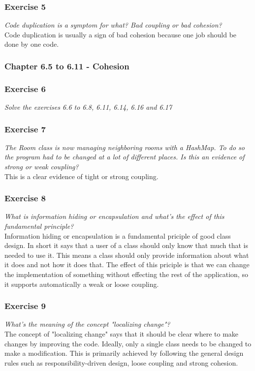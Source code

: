 \subsubsection*{Exercise 5}
\textit{Code duplication is a symptom for what? Bad coupling or bad cohesion? } \\
Code duplication is usually a sign of bad cohesion because one job should be done
by one code. 

\subsubsection{Chapter 6.5 to 6.11 - Cohesion}

\subsubsection*{Exercise 6}
\textit{Solve the exercises 6.6 to 6.8, 6.11, 6.14, 6.16 and 6.17} \\

\subsubsection*{Exercise 7}
\textit{The Room class is now managing neighboring rooms with a HashMap.
To do so the program had to be changed at a lot of different places. 
Is this an evidence of strong or weak coupling?} \\
This is a clear evidence of tight or strong coupling.

\subsubsection*{Exercise 8}
\textit{What is information hiding or encapsulation and what's the effect
of this fundamental principle?} \\
Information hiding or encapsulation is a fundamental priciple of good 
class design. In short it says that a user of a class should only know
that much that is needed to use it. This means a class should only
provide information about what it does and not how it does that.
The effect of this priciple is that we can change the implementation
of something without effecting the rest of the application, so it 
supports automatically a weak or loose coupling.

\subsubsection*{Exercise 9}
\textit{What's the meaning of the concept "localizing change"?} \\
The concept of "localizing change" says that it should be clear where to make
changes by improving the code. Ideally, only a single class needs to be changed
to make a modification. This is primarily achieved by following the general
design rules such as responsibility-driven design, loose coupling and strong 
cohesion.


